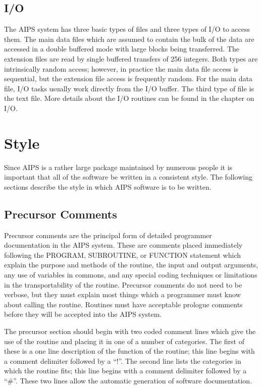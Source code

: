 \subsection{I/O}
The AIPS system has three basic types of files and three types of I/O
to access them.  The main data files which are assumed to contain the
bulk of the data are accessed in a double buffered mode with large
blocks being transferred.  The extension files are read by single
buffered transfers of 256 integers.  Both types are intrinsically
random access; however, in practice the main data file access is
sequential, but the extension file access is frequently random.  For
the main data file, I/O tasks usually work directly from the I/O
buffer.  The third type of file is the text file.  More details about
the I/O routines can be found in the chapter on I/O.

\section{Style}

   Since AIPS is a rather large package maintained by numerous people
it is important that all of the software be written in a consistent
style.  The following sections describe the style in which AIPS
software is to be written.

\subsection{Precursor Comments}
Precursor comments are the principal form of detailed programmer
documentation in the AIPS system. These are comments placed
immediately following the PROGRAM, SUBROUTINE, or FUNCTION statement
which explain the purpose and methods of the routine, the input and
output arguments, any use of variables in commons, and any special
coding techniques or limitations in the transportability of the
routine. Precursor comments do not need to be verbose, but they must
explain most things which a programmer must know about calling the
routine. Routines must have acceptable prologue comments before they
will be accepted into the AIPS system.

The precursor section should begin with two coded comment lines which
give the use of the routine and placing it in one of a number of
categories.  The first of these is a one line description of the
function of the routine; this line begins with a comment delimiter
followed by a ``!''.  The second line lists the categories in which
the routine fits; this line begins with a comment delimiter followed
by a ``\#''.  These two lines allow the automatic generation of
software documentation.


